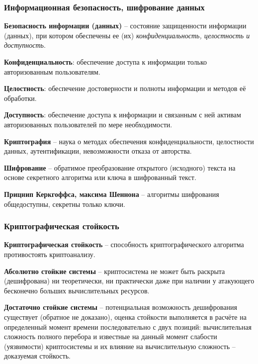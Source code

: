 
\subsubsection{Информационная безопасность, шифрование данных}

\textbf{Безопасность информации (данных)} -- состояние защищенности информации (данных), при котором обеспечены ее (их) \textit{конфиденциальность, целостность и доступность}.

\textbf{Конфиденциальность}: обеспечение доступа к информации только авторизованным пользователям.

\textbf{Целостность}: обеспечение достоверности и полноты информации и методов её обработки.

\textbf{Доступность}: обеспечение доступа к информации и связанным с ней активам авторизованных пользователей по мере необходимости.

\textbf{Криптография} -- наука о методах обеспечения конфиденциальности, целостности данных, аутентификации, невозможности отказа от авторства.

\textbf{Шифрование} -- обратимое преобразование открытого (исходного) текста на основе секретного алгоритма или ключа в шифрованный текст.

\textbf{Прицнип Керкгоффса, максима Шеннона} -- алгоритмы шифрования общедоступны, секретны только ключи.

\subsubsection{Криптографическая стойкость}

\textbf{Криптографическая стойкость} -- способность криптографического алгоритма противостоять криптоанализу.

\textbf{Абсолютно стойкие системы} -- криптосистема не может быть раскрыта (дешифрована) ни теоретически, ни практически даже при наличии у атакующего бесконечно больших вычислительных ресурсов.

\textbf{Достаточно стойкие системы} -- потенциальная возможность дешифрования существует (обратное не доказано), оценка стойкости выполняется в расчёте на определенный момент времени последовательно с двух позиций: вычислительная сложность полного перебора и известные на данный момент слабости (уязвимости) криптосистемы и их влияние на вычислительную сложность -- доказуемая стойкость.

